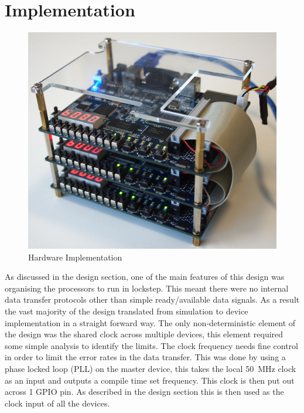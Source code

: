 \chapter{Implementation}
\renewcommand{\baselinestretch}{\mystretch}
\label{chap:implementation}

\begin{figure}[h!]
  \includegraphics[width=\textwidth]{./figs/cluster.jpg}
  \caption{Hardware Implementation}
  \label{fig:cluster}
\end{figure}
As discussed in the design section, one of the main features of this design was organising the processors to run in lockstep. This meant there were no internal data transfer protocols other than simple ready/available data signals. As a result the vast majority of the design translated from simulation to device implementation in a straight forward way. The only non-deterministic element of the design was the shared clock across multiple devices, this element required some simple analysis to identify the limits. The clock frequency needs fine control in order to limit the error rates in the data transfer. This was done by using a phase locked loop (PLL) on the master device, this takes the local 50~MHz clock as an input and outputs a compile time set frequency. This clock is then put out across 1 GPIO pin. As described in the design section this is then used as the clock input of all the devices. 

